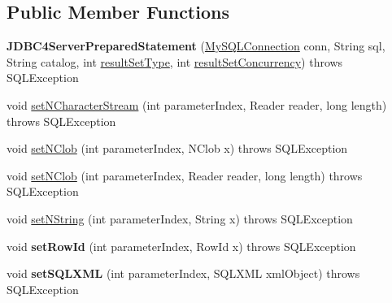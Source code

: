 \subsection*{Public Member Functions}
\begin{DoxyCompactItemize}
\item 
\mbox{\label{classcom_1_1mysql_1_1jdbc_1_1_j_d_b_c4_server_prepared_statement_a750b86c97baef82af4d5031c91b7fd50}} 
{\bfseries J\+D\+B\+C4\+Server\+Prepared\+Statement} (\mbox{\hyperlink{interfacecom_1_1mysql_1_1jdbc_1_1_my_s_q_l_connection}{My\+S\+Q\+L\+Connection}} conn, String sql, String catalog, int \mbox{\hyperlink{classcom_1_1mysql_1_1jdbc_1_1_statement_impl_a9c4013da0e1b73577723769660e4ff25}{result\+Set\+Type}}, int \mbox{\hyperlink{classcom_1_1mysql_1_1jdbc_1_1_statement_impl_aca243fcfce2d3a1be8a97d643b83ddc3}{result\+Set\+Concurrency}})  throws S\+Q\+L\+Exception 
\item 
void \mbox{\hyperlink{classcom_1_1mysql_1_1jdbc_1_1_j_d_b_c4_server_prepared_statement_a2851f64bee907f1c99f2b292e7080ce7}{set\+N\+Character\+Stream}} (int parameter\+Index, Reader reader, long length)  throws S\+Q\+L\+Exception 
\item 
void \mbox{\hyperlink{classcom_1_1mysql_1_1jdbc_1_1_j_d_b_c4_server_prepared_statement_a70863f7e6e565748b968d3ce1d21aad6}{set\+N\+Clob}} (int parameter\+Index, N\+Clob x)  throws S\+Q\+L\+Exception 
\item 
void \mbox{\hyperlink{classcom_1_1mysql_1_1jdbc_1_1_j_d_b_c4_server_prepared_statement_ac23ffa64369e7e5739c4f6c4ad1d0603}{set\+N\+Clob}} (int parameter\+Index, Reader reader, long length)  throws S\+Q\+L\+Exception 
\item 
void \mbox{\hyperlink{classcom_1_1mysql_1_1jdbc_1_1_j_d_b_c4_server_prepared_statement_ae84254367761392e3c048bb7101d1074}{set\+N\+String}} (int parameter\+Index, String x)  throws S\+Q\+L\+Exception 
\item 
\mbox{\label{classcom_1_1mysql_1_1jdbc_1_1_j_d_b_c4_server_prepared_statement_af03aaa0d7bf99936d0412d401cf77153}} 
void {\bfseries set\+Row\+Id} (int parameter\+Index, Row\+Id x)  throws S\+Q\+L\+Exception 
\item 
\mbox{\label{classcom_1_1mysql_1_1jdbc_1_1_j_d_b_c4_server_prepared_statement_ab9a456f6bcfdc50ae5a0cb0b7166979c}} 
void {\bfseries set\+S\+Q\+L\+X\+ML} (int parameter\+Index, S\+Q\+L\+X\+ML xml\+Object)  throws S\+Q\+L\+Exception 
\end{DoxyCompactItemize}
